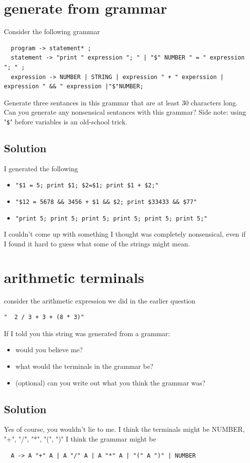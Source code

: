 \documentclass[twoside=false, DIV=14]{scrartcl}
\begin{document}
\section*{generate from grammar}
  Consider the following grammar
\begin{lstlisting}
  program -> statement* ;
  statement -> "print " expression "; " | "$" NUMBER " = " expression "; " ;
  expression -> NUMBER | STRING | expression " + " experssion | expression " && " expression |"$"NUMBER;
\end{lstlisting}

  Generate three sentances in this grammar that are at least 30 characters long. Can you generate any nonsensical sentances with this grammar?  Side note: using "\lstinline|$|" before variables is an old-school trick.
\subsection*{Solution}
  I generated the following
  \begin{itemize}
    \item \lstinline|"$1 = 5; print $1; $2=$1; print $1 + $2;"|
    \item \lstinline|"$12 = 5678 && 3456 + $1 && $2; print $33433 && $77"|
    \item \lstinline|"print 5; print 5; print 5; print 5; print 5; print 5;"|
  \end{itemize}
  I couldn't come up with something I thought was completely nonsensical, even if I found it hard to guess what some of the strings might mean.

\section*{arithmetic terminals}
  consider the arithmetic expression we did in the earlier question
\begin{lstlisting}
"  2 / 3 + 3 + (8 * 3)"
\end{lstlisting}  
If I told you this string was generated from a grammar:
\begin{itemize}
    \item would you believe me?
    \item what would the terminals in the grammar be?
    \item (optional) can you write out what you think the grammar was?
\end{itemize}
\subsection*{Solution}
  Yes of course, you wouldn't lie to me.  I think the terminals might be NUMBER, "+", "/", "*", "(", ")"
  I think the grammar might be
  \begin{lstlisting}
  A -> A "+" A | A "/" A | A "*" A | "(" A ")" | NUMBER
  \end{lstlisting}
\end{document}
